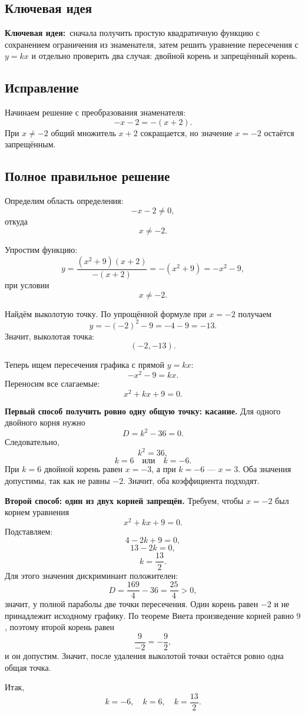 \documentclass[12pt,a4paper]{article}
\newcommand{\keyidea}{\textcolor{blue!60!black}{\textbf{Ключевая идея:}}}
\begin{document}
\subsection*{Ключевая идея}
\keyidea\ сначала получить простую квадратичную функцию с сохранением ограничения из знаменателя, затем решить уравнение пересечения с $y=kx$ и отдельно проверить два случая: двойной корень и запрещённый корень.

\subsection*{Исправление}
Начинаем решение с преобразования знаменателя:
\[
-x-2=-(x+2).
\]
При $x\ne-2$ общий множитель $x+2$ сокращается, но значение $x=-2$ остаётся запрещённым.

\subsection*{Полное правильное решение}
Определим область определения:
\[
-x-2\ne0,
\]
откуда
\[
x\ne-2.
\]

Упростим функцию:
\[
y=\frac{(x^2+9)(x+2)}{-(x+2)}
=-(x^2+9)
=-x^2-9,
\]
при условии
\[
x\ne-2.
\]

Найдём выколотую точку. По упрощённой формуле при $x=-2$ получаем
\[
y=-(-2)^2-9=-4-9=-13.
\]
Значит, выколотая точка:
\[
(-2,-13).
\]

Теперь ищем пересечения графика с прямой $y=kx$:
\[
-x^2-9=kx.
\]
Переносим все слагаемые:
\[
x^2+kx+9=0.
\]

\textbf{Первый способ получить ровно одну общую точку: касание.}
Для одного двойного корня нужно
\[
D=k^2-36=0.
\]
Следовательно,
\[
k^2=36,
\]
\[
k=6\quad\text{или}\quad k=-6.
\]
При $k=6$ двойной корень равен $x=-3$, а при $k=-6$ --- $x=3$. Оба значения допустимы, так как не равны $-2$. Значит, оба коэффициента подходят.

\textbf{Второй способ: один из двух корней запрещён.}
Требуем, чтобы $x=-2$ был корнем уравнения
\[
x^2+kx+9=0.
\]
Подставляем:
\[
4-2k+9=0,
\]
\[
13-2k=0,
\]
\[
k=\frac{13}{2}.
\]
Для этого значения дискриминант положителен:
\[
D=\frac{169}{4}-36=\frac{25}{4}>0,
\]
значит, у полной параболы две точки пересечения. Один корень равен $-2$ и не принадлежит исходному графику. По теореме Виета произведение корней равно $9$, поэтому второй корень равен
\[
\frac{9}{-2}=-\frac{9}{2},
\]
и он допустим. Значит, после удаления выколотой точки остаётся ровно одна общая точка.

Итак,
\[
\boxed{k=-6,\quad k=6,\quad k=\frac{13}{2}}.
\]
\end{document}
